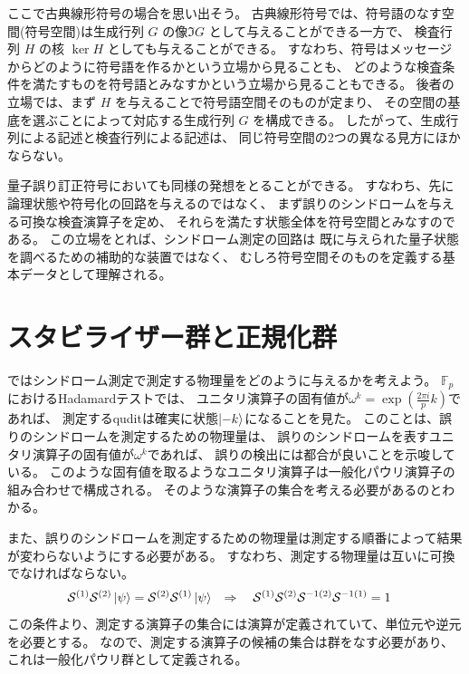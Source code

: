 \documentclass[../master.tex]{subfiles}
\begin{document}
ここで古典線形符号の場合を思い出そう。
古典線形符号では、符号語のなす空間(符号空間)は生成行列 $G$ の像$\Im G$ として与えることができる一方で、
検査行列 $H$ の核 $\ker H$ としても与えることができる。
すなわち、符号はメッセージからどのように符号語を作るかという立場から見ることも、
どのような検査条件を満たすものを符号語とみなすかという立場から見ることもできる。
後者の立場では、まず $H$ を与えることで符号語空間そのものが定まり、
その空間の基底を選ぶことによって対応する生成行列 $G$ を構成できる。
したがって、生成行列による記述と検査行列による記述は、
同じ符号空間の2つの異なる見方にほかならない。

量子誤り訂正符号においても同様の発想をとることができる。
すなわち、先に論理状態や符号化の回路を与えるのではなく、
まず誤りのシンドロームを与える可換な検査演算子を定め、
それらを満たす状態全体を符号空間とみなすのである。
この立場をとれば、シンドローム測定の回路は
既に与えられた量子状態を調べるための補助的な装置ではなく、
むしろ符号空間そのものを定義する基本データとして理解される。

\section{スタビライザー群と正規化群}
ではシンドローム測定で測定する物理量をどのように与えるかを考えよう。
$\mathbb{F}_p$におけるHadamardテストでは、
ユニタリ演算子の固有値が$\omega^k = \exp(\frac{2\pi i}{p}k)$であれば、
測定するquditは確実に状態$\ket{-k}$になることを見た。
このことは、誤りのシンドロームを測定するための物理量は、
誤りのシンドロームを表すユニタリ演算子の固有値が$\omega^k$であれば、
誤りの検出には都合が良いことを示唆している。
このような固有値を取るようなユニタリ演算子は一般化パウリ演算子の組み合わせで構成される。
そのような演算子の集合を考える必要があるのとわかる。

また、誤りのシンドロームを測定するための物理量は測定する順番によって結果が変わらないようにする必要がある。
すなわち、測定する物理量は互いに可換でなければならない。
\begin{equation}\begin{aligned}[b]
    \mathcal{S}^{(1)}\mathcal{S}^{(2)}\ket{\psi} &= \mathcal{S}^{(2)}\mathcal{S}^{(1)}\ket{\psi}  &
    \Rightarrow \quad \mathcal{S}^{(1)}\mathcal{S}^{(2)}\mathcal{S}^{-1 (2)} \mathcal{S}^{-1 (1)}&=1
\end{aligned}\end{equation}
この条件より、測定する演算子の集合には演算が定義されていて、単位元や逆元を必要とする。
なので、測定する演算子の候補の集合は群をなす必要があり、これは一般化パウリ群として定義される。
\end{document}
